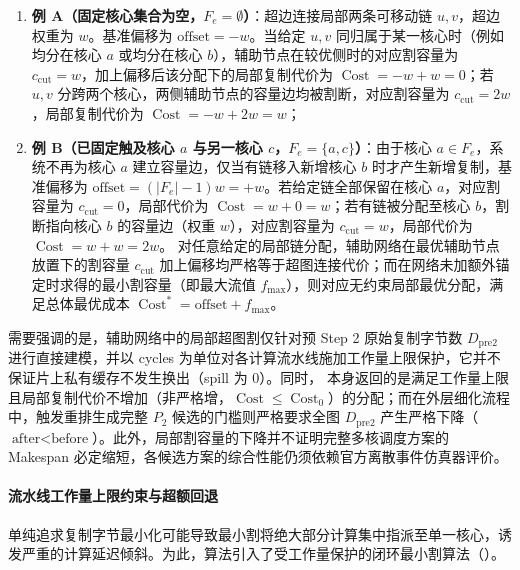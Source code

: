 \documentclass[anonymous,withtoc]{gmcm2026}
\providecommand{\tightlist}{\setlength{\itemsep}{0pt}\setlength{\parskip}{0pt}}
\begin{document}
\begin{enumerate}
\def\labelenumi{\arabic{enumi}.}
\tightlist
\item
  \textbf{例 A（固定核心集合为空，\(F_e = \emptyset\)）}：超边连接局部两条可移动链 \(u, v\)，超边权重为 \(w\)。基准偏移为 \(\text{offset} = -w\)。当给定 \(u, v\) 同归属于某一核心时（例如均分在核心 \(a\) 或均分在核心 \(b\)），辅助节点在较优侧时的对应割容量为 \(c_{\mathrm{cut}} = w\)，加上偏移后该分配下的局部复制代价为 \(\operatorname{Cost} = -w + w = 0\)；若 \(u, v\) 分跨两个核心，两侧辅助节点的容量边均被割断，对应割容量为 \(c_{\mathrm{cut}} = 2w\)，局部复制代价为 \(\operatorname{Cost} = -w + 2w = w\)；
\item
  \textbf{例 B（已固定触及核心 \(a\) 与另一核心 \(c\)，\(F_e = \{a, c\}\)）}：由于核心 \(a \in F_e\)，系统不再为核心 \(a\) 建立容量边，仅当有链移入新增核心 \(b\) 时才产生新增复制，基准偏移为 \(\text{offset} = (|F_e| - 1)w = +w\)。若给定链全部保留在核心 \(a\)，对应割容量为 \(c_{\mathrm{cut}} = 0\)，局部代价为 \(\operatorname{Cost} = w + 0 = w\)；若有链被分配至核心 \(b\)，割断指向核心 \(b\) 的容量边（权重 \(w\)），对应割容量为 \(c_{\mathrm{cut}} = w\)，局部代价为 \(\operatorname{Cost} = w + w = 2w\)。 对任意给定的局部链分配，辅助网络在最优辅助节点放置下的割容量 \(c_{\mathrm{cut}}\) 加上偏移均严格等于超图连接代价；而在网络未加额外锚定时求得的最小割容量（即最大流值 \(f_{\max}\)），则对应无约束局部最优分配，满足总体最优成本 \(\operatorname{Cost}^* = \text{offset} + f_{\max}\)。
\end{enumerate}

需要强调的是，辅助网络中的局部超图割仅针对预 Step 2 原始复制字节数 \(D_{\mathrm{pre2}}\) 进行直接建模，并以 cycles 为单位对各计算流水线施加工作量上限保护，它并不保证片上私有缓存不发生换出（spill 为 0）。同时，\texttt{} 本身返回的是满足工作量上限且局部复制代价不增加（非严格增，\(\operatorname{Cost} \le \operatorname{Cost}_0\)）的分配；而在外层细化流程 \texttt{} 中，触发重排生成完整 \(P_2\) 候选的门槛则严格要求全图 \(D_{\mathrm{pre2}}\) 产生严格下降（\(\text{after} < \text{before}\)）。此外，局部割容量的下降并不证明完整多核调度方案的 Makespan 必定缩短，各候选方案的综合性能仍须依赖官方离散事件仿真器评价。

\paragraph{流水线工作量上限约束与超额回退}

单纯追求复制字节最小化可能导致最小割将绝大部分计算集中指派至单一核心，诱发严重的计算延迟倾斜。为此，算法引入了受工作量保护的闭环最小割算法（\texttt{}）。
\end{document}

